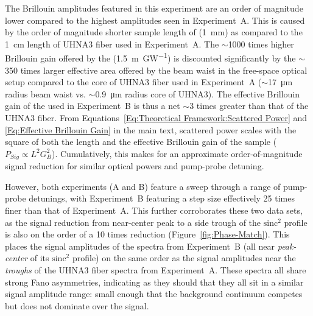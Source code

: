The Brillouin amplitudes featured in this experiment are an order of magnitude lower compared to the highest amplitudes seen in Experiment~A. This is caused by the order of magnitude shorter sample length of  (\SI{1}{\milli\meter}) as compared to the \SI{1}{\centi\meter} length of UHNA3 fiber used in Experiment~A. The \(\sim\)1000 times higher Brillouin gain offered by the  (\SI{1.5}{\meter\per\giga\watt}) is discounted significantly by the \(\sim\)350 times larger effective area offered by the beam waist in the free-space optical setup compared to the core of UHNA3 fiber used in Experiment~A (\(\sim\)\SI{17}{\micro\meter} radius beam waist vs. \(\sim\)\SI{0.9}{\micro\meter} radius core of UHNA3). The effective Brillouin gain of the  used in Experiment~B is thus a net \(\sim\)3 times greater than that of the UHNA3 fiber. From Equations~\ref{Eq:Theoretical Framework:Scattered Power} and \ref{Eq:Effective Brillouin Gain} in the main text, scattered power scales with the square of both the length and the effective Brillouin gain of the sample (\(P_{Sig} \propto L^{2}G_{B}^{2}\)). Cumulatively, this makes for an approximate order-of-magnitude signal reduction for similar optical powers and pump-probe detuning.

However, both experiments (A and B) feature a sweep through a range of pump-probe detunings, with Experiment~B featuring a step size effectively 25 times finer than that of Experiment~A. This further corroborates these two data sets, as the signal reduction from near-center peak to a side trough of the \(\mathrm{sinc^{2}}\) profile is also on the order of a 10 times reduction (Figure~\ref{fig:Phase-Match}). This places the signal amplitudes of the  spectra from Experiment~B (all near \textit{peak-center} of its \(\mathrm{sinc^{2}}\) profile) on the same order as the signal amplitudes near the \textit{troughs} of the UHNA3 fiber spectra from Experiment~A. These spectra all share strong Fano asymmetries, indicating as they should that they all sit in a similar signal amplitude range: small enough that the background continuum competes but does not dominate over the signal.

